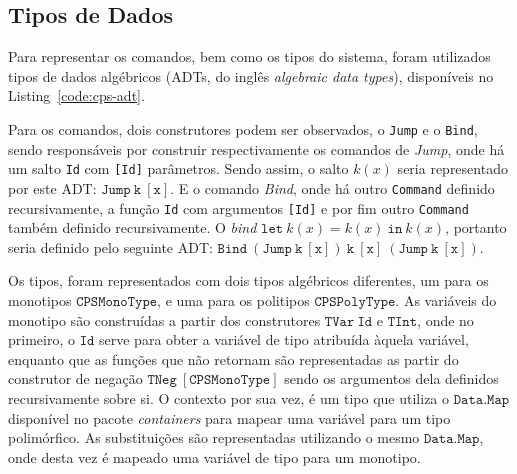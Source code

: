 \subsection{Tipos de Dados}\label{subsec:cps-adt}

Para representar os comandos, bem como os tipos do sistema, foram utilizados tipos de dados algébricos (ADTs, do inglês \textit{algebraic data types}), disponíveis no Listing~\ref{code:cps-adt}.


Para os comandos, dois construtores podem ser observados, o \texttt{Jump} e o \texttt{Bind}, sendo responsáveis por construir respectivamente os comandos de \textit{Jump}, onde há um salto \texttt{Id} com \texttt{[Id]} parâmetros.
Sendo assim, o salto $k(x)$ seria representado por este ADT: $\mathtt{Jump\ k\ [x]}$.
E o comando \textit{Bind}, onde há outro \texttt{Command} definido recursivamente, a função \texttt{Id} com argumentos \texttt{[Id]} e por fim outro \texttt{Command} também definido recursivamente.
O \textit{bind} $\mathtt{let}\ k(x) = k(x)\ \mathtt{in}\ k(x)$, portanto seria definido pelo seguinte ADT: $\mathtt{Bind\ (Jump\ k\ [x])\ k\ [x]\ (Jump\ k\ [x])}$.

Os tipos, foram representados com dois tipos algébricos diferentes, um para os monotipos $\mathtt{CPSMonoType}$, e uma para os politipos $\mathtt{CPSPolyType}$.
As variáveis do monotipo são construídas a partir dos construtores $\mathtt{TVar\ Id}$ e $\mathtt{TInt}$, onde no primeiro, o $\mathtt{Id}$ serve para obter a variável de tipo atribuída àquela variável, enquanto que as funções que não retornam são representadas as partir do construtor de negação $\mathtt{TNeg\ [CPSMonoType]}$ sendo os argumentos dela definidos recursivamente sobre si.
O contexto por sua vez, é um tipo que utiliza o $\mathtt{Data.Map}$ disponível no pacote \textit{containers} para mapear uma variável para um tipo polimórfico.
As substituições são representadas utilizando o mesmo $\mathtt{Data.Map}$, onde desta vez é mapeado uma variável de tipo para um monotipo.
